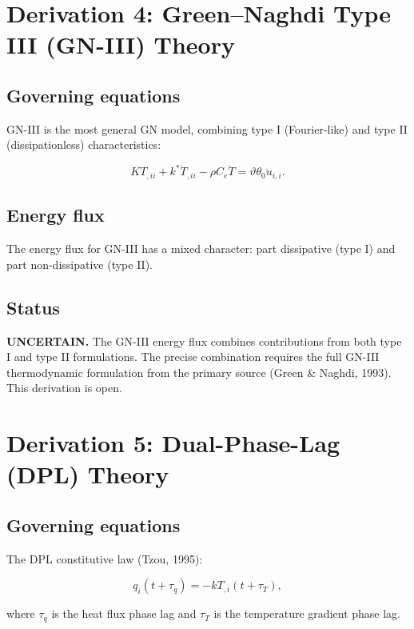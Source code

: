 \documentclass{article}
\begin{document}
\section{Derivation 4: Green--Naghdi Type III (GN-III) Theory}

\subsection{Governing equations}

GN-III is the most general GN model, combining type I (Fourier-like) and type II (dissipationless) characteristics:

\begin{equation}
K T_{,ii} + k^*\dot{T}_{,ii} - \rho C_e\ddot{T} = \vartheta\theta_0\ddot{u}_{i,i}.
\label{ef:gn3:1}
\end{equation}

\subsection{Energy flux}

The energy flux for GN-III has a mixed character: part dissipative (type I) and part non-dissipative (type II).

\subsection{Status}

\textbf{UNCERTAIN.} The GN-III energy flux combines contributions from both type I and type II formulations. The precise combination requires the full GN-III thermodynamic formulation from the primary source (Green \& Naghdi, 1993). This derivation is open.

\section{Derivation 5: Dual-Phase-Lag (DPL) Theory}

\subsection{Governing equations}

The DPL constitutive law (Tzou, 1995):

\begin{equation}
q_i(t + \tau_q) = -k T_{,i}(t + \tau_T),
\label{ef:dpl:1}
\end{equation}

where $\tau_q$ is the heat flux phase lag and $\tau_T$ is the temperature gradient phase lag.
\end{document}
